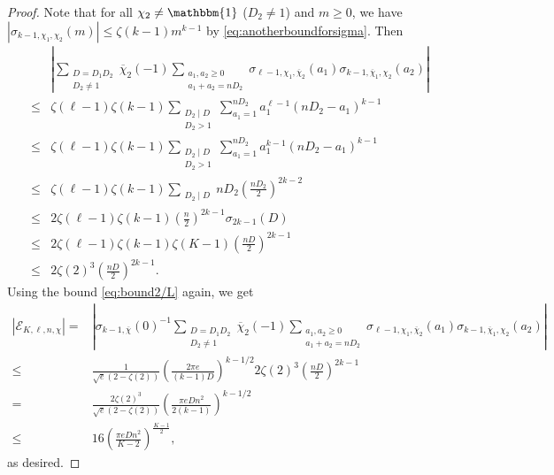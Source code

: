 \documentclass[11pt,letterpaper,reqno]{amsart}
\numberwithin{figure}{section}
\numberwithin{table}{section}
\theoremstyle{definition}
\theoremstyle{plain}
\theoremstyle{definition}
\theoremstyle{definition}
\theoremstyle{remark}
\numberwithin{equation}{section}
\theoremstyle{remark}
\begin{document}
\begin{proof}
    Note that for all $\chi_2\neq\mathbbm{1}$ ($D_2\neq1$) and $m\geq0$, we have $|\sigma_{k-1,\chi_1,\chi_2}(m)|\leq \zeta(k-1)m^{k-1}$ by \eqref{eq:anotherboundforsigma}. Then 
    \begin{align}
        &\left|\sum_{\substack{D=D_1D_2\\D_2\neq 1 }}\overline{\chi}_2(-1)\sum_{\substack{a_1,a_2\geq0\\a_1+a_2=nD_2}}\sigma_{\ell-1,\chi_1,\overline{\chi}_{2}}(a_1)\sigma_{k-1,\overline{\chi}_{1},\chi_2}(a_2)\right|  \nonumber\\\leq&\zeta(\ell-1)\zeta(k-1)\sum_{\substack{D_2\mid D\\D_2>1}}\sum_{a_1=1}^{nD_2}a_1^{\ell-1}(nD_2-a_1)^{k-1}  \nonumber\\\leq&\zeta(\ell-1)\zeta(k-1)\sum_{\substack{D_2\mid D\\D_2>1}}\sum_{a_1=1}^{nD_2}a_1^{k-1}(nD_2-a_1)^{k-1}  \nonumber\\\leq&\zeta(\ell-1)\zeta(k-1)\sum_{\substack{D_2\mid D}}nD_2\left(\frac{nD_2}{2}\right)^{2k-2}\\\leq&2\zeta(\ell-1)\zeta(k-1)\left(\frac{n}{2}\right)^{2k-1}\sigma_{2k-1}(D)  \nonumber\\\leq&2\zeta(\ell-1)\zeta(k-1)\zeta(K-1)\left(\frac{nD}{2}\right)^{2k-1}\label{eq:accuratebdforcentralL}\\\leq&2\zeta(2)^3\left(\frac{nD}{2}\right)^{2k-1}.\label{eq:bdEpsilon}
    \end{align}
    Using the bound \eqref{eq:bound2/L} again, we get
    \begin{align}
\left|\mathscr{E}_{K,\ell,n,\chi}\right|=&\left|\sigma_{k-1,\overline{\chi}}(0)^{-1}\sum\limits_{\substack{D=D_1D_2\\D_2\neq 1}}\overline{\chi}_2(-1)\sum\limits_{\substack{a_1,a_2\geq0\\a_1+a_2=nD_2}}\sigma_{\ell-1,\chi_1,\overline{\chi}_{2}}(a_1)\sigma_{k-1,\overline{\chi}_{1},\chi_2}(a_2)\right|
        \nonumber  \\\leq&\frac{1}{\sqrt{e}(2-\zeta(2))}\left(\frac{2\pi e}{(k-1)D}\right)^{k-1/2}2\zeta(2)^3\left(\frac{nD}{2}\right)^{2k-1}  \nonumber\\=&\frac{2\zeta(2)^3}{\sqrt{e}(2-\zeta(2))}\left(\frac{\pi eDn^2}{2(k-1)}\right)^{k-1/2}  \nonumber\\\leq&16\left(\frac{\pi eDn^2}{K-2}\right)^{\frac{K-1}{2}},\label{eq:bdEpsilon2}
    \end{align}
    as desired.
\end{proof}
\end{document}
